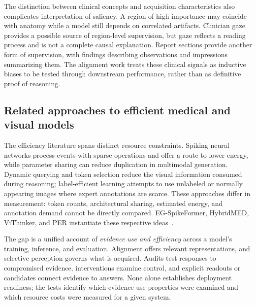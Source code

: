 The distinction between clinical concepts and acquisition characteristics also complicates interpretation of saliency. A region of high importance may coincide with anatomy while a model still depends on correlated artifacts. Clinician gaze provides a possible source of region-level supervision, but gaze reflects a reading process and is not a complete causal explanation. Report sections provide another form of supervision, with findings describing observations and impressions summarizing them. The alignment work treats these clinical signals as inductive biases to be tested through downstream performance, rather than as definitive proof of reasoning.

\subsection{Related approaches to efficient medical and visual models}
The efficiency literature spans distinct resource constraints. Spiking neural networks process events with sparse operations and offer a route to lower energy, while parameter sharing can reduce duplication in multimodal generation. Dynamic querying and token selection reduce the visual information consumed during reasoning; label-efficient learning attempts to use unlabeled or normally appearing images where expert annotations are scarce. These approaches differ in measurement: token counts, architectural sharing, estimated energy, and annotation demand cannot be directly compared. EG-SpikeFormer, HybridMED, ViThinker, and PER instantiate these respective ideas~\citep{egspike,hybridmed,vithinker,per}.

The gap is a unified account of \emph{evidence use and efficiency} across a model's training, inference, and evaluation. Alignment offers relevant representations, and selective perception governs what is acquired. Audits test responses to compromised evidence, interventions examine control, and explicit readouts or candidates connect evidence to answers. None alone establishes deployment readiness; the tests identify which evidence-use properties were examined and which resource costs were measured for a given system.
